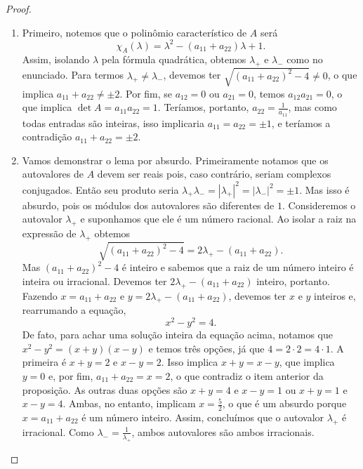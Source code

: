 \begin{proof}
	\begin{enumerate}
	\item Primeiro, notemos que o polinômio característico de $A$ será
	\begin{equation*}
	\chi_A(\lambda) = \lambda^2 -(a_{11}+a_{22})\lambda+1.
	\end{equation*}
Assim, isolando $\lambda$ pela fórmula quadrática, obtemos $\lambda_+$ e $\lambda_-$ como no enunciado. Para termos $\lambda_+ \neq \lambda_-$, devemos ter $\sqrt{(a_{11}+a_{22})^2 - 4} \neq 0$, o que implica $a_{11}+a_{22} \neq \pm 2$. Por fim, se $a_{12} = 0$ ou $a_{21} = 0$, temos $a_{12}a_{21} = 0$, o que implica $\det A = a_{11}a_{22} = 1$. Teríamos, portanto, $a_{22} = \frac{1}{a_{11}}$, mas como todas entradas são inteiras, isso implicaria $a_{11} = a_{22} = \pm 1$, e teríamos a contradição $a_{11} + a_{22} = \pm 2$.

	\item Vamos demonstrar o lema por absurdo. Primeiramente notamos que os autovalores de $A$ devem ser reais pois, caso contrário, seriam complexos conjugados. Então seu produto seria $\lambda_+ \lambda_- = |\lambda_+|^2 = |\lambda_-|^2 = \pm 1$. Mas isso é absurdo, pois os módulos dos autovalores são diferentes de $1$. Consideremos o autovalor $\lambda_{+}$ e suponhamos que ele é um número racional. Ao isolar a raiz na expressão de $\lambda_{+}$ obtemos
	\begin{equation*}
	\sqrt{(a_{11}+a_{22})^2 - 4} = 2\lambda_{+}-(a_{11}+a_{22}).
	\end{equation*}
Mas $(a_{11}+a_{22})^2 - 4$ é inteiro e sabemos que a raiz de um número inteiro é inteira ou irracional. Devemos ter $2\lambda_{+}-(a_{11}+a_{22})$ inteiro, portanto. Fazendo $x = a_{11}+a_{22}$ e $y = 2\lambda_{+}-(a_{11}+a_{22})$, devemos ter $x$ e $y$ inteiros e, rearrumando a equação,
	\begin{equation*}
	x^2 - y^2 = 4.
	\end{equation*}
De fato, para achar uma solução inteira da equação acima, notamos que $x^2 - y^2 = (x+y)(x-y)$ e temos três opções, já que $4=2 \cdot 2 = 4 \cdot 1$. A primeira é $x+y = 2$ e $x-y = 2$. Isso implica $x+y = x-y$, que implica $y=0$ e, por fim, $a_{11}+a_{22} = x = 2$, o que contradiz o item anterior da proposição. As outras duas opções são $x+y = 4$ e $x-y = 1$ ou $x+y = 1$ e $x-y = 4$. Ambas, no entanto, implicam $x = \frac{5}{2}$, o que é um absurdo porque $x = a_{11}+a_{22}$ é um número inteiro. Assim, concluímos que o autovalor $\lambda_{+}$ é irracional. Como $\lambda_- = \frac{1}{\lambda_+}$, ambos autovalores são ambos irracionais.


\end{enumerate}
\end{proof}
